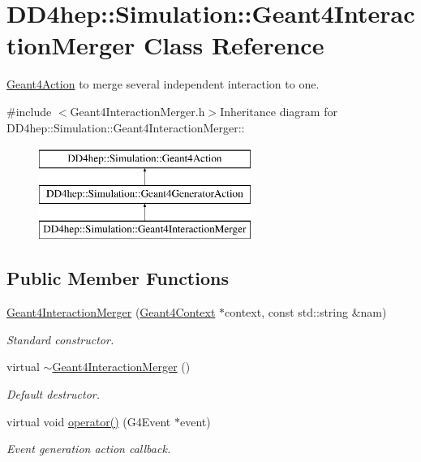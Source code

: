 \hypertarget{class_d_d4hep_1_1_simulation_1_1_geant4_interaction_merger}{
\section{DD4hep::Simulation::Geant4InteractionMerger Class Reference}
\label{class_d_d4hep_1_1_simulation_1_1_geant4_interaction_merger}
}


\hyperlink{class_d_d4hep_1_1_simulation_1_1_geant4_action}{Geant4Action} to merge several independent interaction to one.  


{\ttfamily \#include $<$Geant4InteractionMerger.h$>$}Inheritance diagram for DD4hep::Simulation::Geant4InteractionMerger::\begin{figure}[H]
\begin{center}
\leavevmode
\includegraphics[height=3cm]{class_d_d4hep_1_1_simulation_1_1_geant4_interaction_merger}
\end{center}
\end{figure}
\subsection*{Public Member Functions}
\begin{DoxyCompactItemize}
\item 
\hyperlink{class_d_d4hep_1_1_simulation_1_1_geant4_interaction_merger_ad80869d9440400a2d4936649441aa0aa}{Geant4InteractionMerger} (\hyperlink{class_d_d4hep_1_1_simulation_1_1_geant4_context}{Geant4Context} $\ast$context, const std::string \&nam)
\begin{DoxyCompactList}\small\item\em Standard constructor. \item\end{DoxyCompactList}\item 
virtual \hyperlink{class_d_d4hep_1_1_simulation_1_1_geant4_interaction_merger_a2ef1b19a45945a77332eb85f2fe2d8bf}{$\sim$Geant4InteractionMerger} ()
\begin{DoxyCompactList}\small\item\em Default destructor. \item\end{DoxyCompactList}\item 
virtual void \hyperlink{class_d_d4hep_1_1_simulation_1_1_geant4_interaction_merger_a5af2cee708859468f78130560ffa4a6e}{operator()} (G4Event $\ast$event)
\begin{DoxyCompactList}\small\item\em Event generation action callback. \item\end{DoxyCompactList}\end{DoxyCompactItemize}
